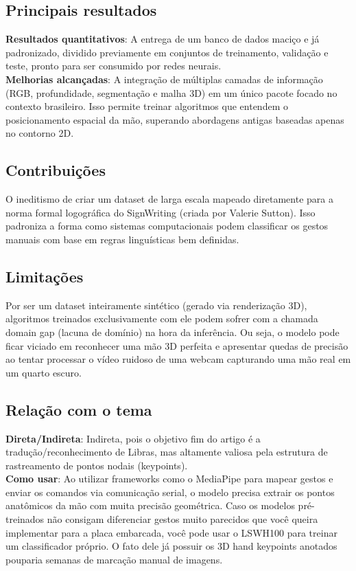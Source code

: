 \documentclass[12pt, a4paper]{article}
\begin{document}
\subsection{Principais resultados}
\textbf{Resultados quantitativos}: A entrega de um banco de dados maciço e já padronizado, dividido previamente em conjuntos de treinamento, validação e teste, pronto para ser consumido por redes neurais.\\
\textbf{Melhorias alcançadas}: A integração de múltiplas camadas de informação (RGB, profundidade, segmentação e malha 3D) em um único pacote focado no contexto brasileiro. Isso permite treinar algoritmos que entendem o posicionamento espacial da mão, superando abordagens antigas baseadas apenas no contorno 2D.\\
\subsection{Contribuições}
O ineditismo de criar um dataset de larga escala mapeado diretamente para a norma formal logográfica do SignWriting (criada por Valerie Sutton). Isso padroniza a forma como sistemas computacionais podem classificar os gestos manuais com base em regras linguísticas bem definidas.\\
\subsection{Limitações}
Por ser um dataset inteiramente sintético (gerado via renderização 3D), algoritmos treinados exclusivamente com ele podem sofrer com a chamada domain gap (lacuna de domínio) na hora da inferência. Ou seja, o modelo pode ficar viciado em reconhecer uma mão 3D perfeita e apresentar quedas de precisão ao tentar processar o vídeo ruidoso de uma webcam capturando uma mão real em um quarto escuro.\\
\subsection{Relação com o tema}
\textbf{Direta/Indireta}: Indireta, pois o objetivo fim do artigo é a tradução/reconhecimento de Libras, mas altamente valiosa pela estrutura de rastreamento de pontos nodais (keypoints).\\
\textbf{Como usar}: Ao utilizar frameworks como o MediaPipe para mapear gestos e enviar os comandos via comunicação serial, o modelo precisa extrair os pontos anatômicos da mão com muita precisão geométrica. Caso os modelos pré-treinados não consigam diferenciar gestos muito parecidos que você queira implementar para a placa embarcada, você pode usar o LSWH100 para treinar um classificador próprio. O fato dele já possuir os 3D hand keypoints anotados pouparia semanas de marcação manual de imagens.\\
\end{document}
